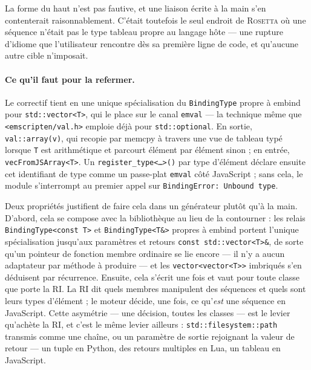 \documentclass[11pt,a4paper]{article}
\newcommand{\rosetta}{\textsc{Rosetta}}
\newcommand{\code}[1]{\texttt{\small #1}}
\begin{document}
La forme du haut n'est pas fautive, et une liaison écrite à la main s'en
contenterait raisonnablement. C'était toutefois le seul endroit de \rosetta{} où
une séquence n'était pas le type tableau propre au langage hôte --- une rupture
d'idiome que l'utilisateur rencontre dès sa première ligne de code, et qu'aucune
autre cible n'imposait.

\paragraph{Ce qu'il faut pour la refermer.} Le correctif tient en une unique
spécialisation du \code{BindingType} propre à embind pour
\code{std::vector<T>}, qui le place sur le canal \code{emval} --- la technique
même que \code{<emscripten/val.h>} emploie déjà pour \code{std::optional}. En
sortie, \code{val::array(v)}, qui recopie par memcpy à travers une vue de
tableau typé lorsque \code{T} est arithmétique et parcourt élément par élément
sinon ; en entrée, \code{vecFromJSArray<T>}. Un
\code{register\_type<\dots>()} par type d'élément déclare ensuite cet
identifiant de type comme un passe-plat \code{emval} côté JavaScript ; sans
cela, le module s'interrompt au premier appel sur
\code{BindingError: Unbound type}.

Deux propriétés justifient de faire cela dans un générateur plutôt qu'à la main.
D'abord, cela se compose avec la bibliothèque au lieu de la contourner : les
relais \code{BindingType<const T>} et \code{BindingType<T\&>} propres à embind
portent l'unique spécialisation jusqu'aux paramètres et retours
\code{const std::vector<T>\&}, de sorte qu'un pointeur de fonction membre
ordinaire se lie encore --- il n'y a aucun adaptateur par méthode à produire ---
et les \code{vector<vector<T>>} imbriqués s'en déduisent par récurrence.
Ensuite, cela s'écrit une fois et vaut pour toute classe que porte la RI. La RI
dit quels membres manipulent des séquences et quels sont leurs types d'élément ;
le moteur décide, une fois, ce qu'\emph{est} une séquence en JavaScript. Cette
asymétrie --- une décision, toutes les classes --- est le levier qu'achète la
RI, et c'est le même levier ailleurs : \code{std::filesystem::path} transmis
comme une chaîne, ou un paramètre de sortie rejoignant la valeur de retour ---
un tuple en Python, des retours multiples en Lua, un tableau en JavaScript.
\end{document}
